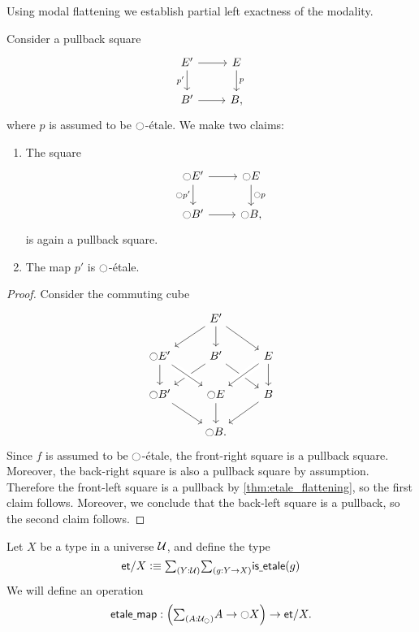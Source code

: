 \documentclass[9pt,twosided]{amsart}
\newcommand{\et}{\mathsf{et}}
\begin{document}
Using modal flattening we establish partial left exactness of the modality.

\begin{cor}\label{cor:etale_lex}
Consider a pullback square
\begin{equation*}
\begin{tikzcd}
E' \arrow[d,swap,"{p'}"] \arrow[r] & E \arrow[d,"p"] \\
B' \arrow[r] & B,
\end{tikzcd}
\end{equation*}
where $p$ is assumed to be ${\ocircle}$-\'etale. We make two claims:
\begin{enumerate}
\item The square
\begin{equation*}
\begin{tikzcd}
\modal E' \arrow[d,swap,"{\modal p'}"] \arrow[r] & \modal E \arrow[d,"\modal p"] \\
\modal B' \arrow[r] & \modal B,
\end{tikzcd}
\end{equation*}
is again a pullback square.
\item The map $p'$ is ${\ocircle}$-\'etale.
\end{enumerate}
\end{cor}

\begin{proof}
  Consider the commuting cube
  \begin{equation*}
    \begin{tikzcd}
      &[-.5ex] E' \arrow[dr] \arrow[d] \arrow[dl] \\
      \modal E' \arrow[d] & B' \arrow[dl] \arrow[dr] & E \arrow[dl,crossing over] \arrow[d] \\
      \modal B' \arrow[dr] & \modal E \arrow[d] \arrow[from=ul,crossing over] & B \arrow[dl] \\
      & \modal B.
    \end{tikzcd}
  \end{equation*}
  Since $f$ is assumed to be ${\ocircle}$-\'etale, the front-right square is a pullback square. Moreover, the back-right square is also a pullback square by assumption. Therefore the front-left square is a pullback by \cref{thm:etale_flattening}, so the first claim follows. Moreover, we conclude that the back-left square is a pullback, so the second claim follows.
\end{proof}

\begin{defn}
  Let $X$ be a type in a universe $\mathcal{U}$, and define the type
  \begin{equation*}
    \et/X\defeq \sm{Y:\UU}{g:Y\to X}\isetale(g)
  \end{equation*}
  We will define an operation
  \begin{equation*}
    \etmap:\Big(\sm{A:\UU_\modal}A\to\modal X\Big)\to\et/X.
  \end{equation*}
\end{defn}
\end{document}

